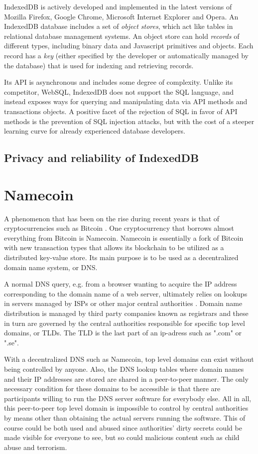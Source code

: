 IndexedDB is actively developed and implemented in the latest versions of Mozilla Firefox, Google Chrome, Microsoft Internet Explorer and Opera. An IndexedDB database includes a set of \emph{object stores}, which act like tables in relational database management systems. An object store can hold \emph{records} of different types, including binary data and Javascript primitives and objects. Each record has a \emph{key} (either specified by the developer or automatically managed by the database) that is used for indexing and retrieving records.

Its API is asynchronous and includes some degree of complexity. Unlike its competitor, WebSQL, IndexedDB does not support the SQL language, and instead exposes ways for querying and manipulating data via API methods and transactions objects. A positive facet of the rejection of SQL in favor of API methods is the prevention of SQL injection attacks, but with the cost of a steeper learning curve for already experienced database developers.

\subsection{Privacy and reliability of IndexedDB}

\section{Namecoin}
A phenomenon that has been on the rise during recent years is that of cryptocurrencies such as Bitcoin \cite{CryptoCoinInsider:2014:Online}. One cryptocurrency that borrows almost everything from Bitcoin is Namecoin\cite{CryptoCoinInsider:2014:Online}. Namecoin is essentially a fork of Bitcoin with new transaction types that allows its blockchain to be utilized as a distributed key-value store. Its main purpose is to be used as a decentralized domain name system, or DNS.

A normal DNS query, e.g. from a browser wanting to acquire the IP address corresponding to the domain name of a web server, ultimately relies on lookups in servers managed by ISPs or other major central authorities \cite{CryptoCoinInsider:2014:Online}. Domain name distribution is managed by third party companies known as registrars and these in turn are governed by the central authorities responsible for specific top level domains, or TLDs. The TLD is the last part of an ip-adress such as ".com" or ".se".

With a decentralized DNS such as Namecoin, top level domains can exist without being controlled by anyone\cite{CryptoCoinInsider:2014:Online}. Also, the DNS lookup tables where domain names and their IP addresses are stored are shared in a peer-to-peer manner. The only necessary condition for these domains to be accessible is that there are participants willing to run the DNS server software for everybody else. All in all, this peer-to-peer top level domain is impossible to control by central authorities by means other than obtaining the actual servers running the software. This of course could be both used and abused since authorities’ dirty secrets could be made visible for everyone to see, but so could malicious content such as child abuse and terrorism.

